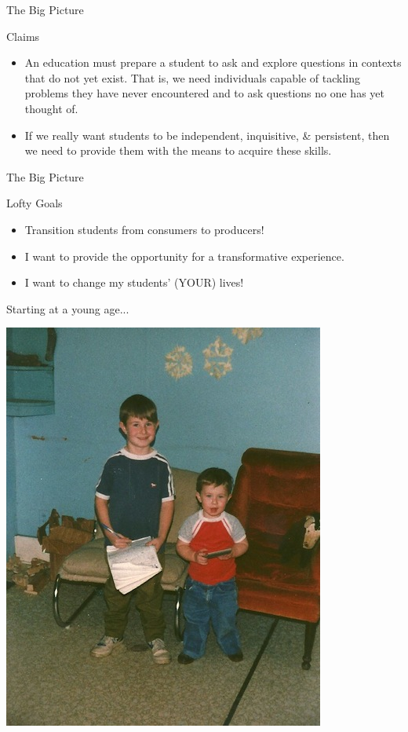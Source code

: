 \documentclass[12pt]{beamer}
\begin{document}

\begin{frame}{The Big Picture}

\begin{block}{Claims}
\vspace{-.75em}
\begin{itemize}
\item An education must prepare a student to ask and explore questions in contexts that do not yet exist. That is, we need individuals capable of tackling problems they have never encountered and to ask questions no one has yet thought of.
\item If we really want students to be independent, inquisitive, \& persistent, then we need to provide them with the means to acquire these skills.
\end{itemize}
\end{block}

\end{frame}

\begin{frame}{The Big Picture}
\begin{block}{Lofty Goals}
\vspace{-.75em}
\begin{itemize}
\item Transition students from consumers to producers!
\item I want to provide the opportunity for a transformative experience. 
\item I want to change my students' (YOUR) lives!
\end{itemize}
\end{block}

\end{frame}


\begin{frame}{Starting at a young age...}
\begin{center}
\includegraphics[scale=1.5]{notebook.jpg}
\end{center}
\end{frame}
\end{document}
